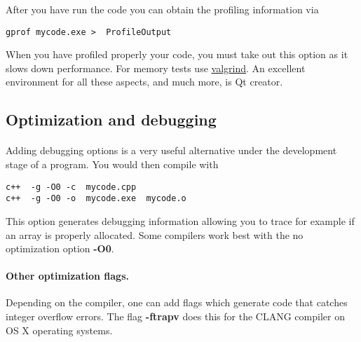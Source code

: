 \documentclass[%
oneside,                 %
final,                   %
10pt]{article}
\begin{document}
After you have run the code you can obtain the profiling information via


\begin{verbatim}
gprof mycode.exe >  ProfileOutput

\end{verbatim}

When you have profiled properly your code, you must take out this option as it 
slows down performance.
For memory tests use \href{{http://www.valgrind.org}}{valgrind}. An excellent environment for all these aspects, and much  more, is  Qt creator.



\subsection*{Optimization and debugging}

\paragraph{}
Adding debugging options is a very useful alternative under the development stage of a program.
You would then compile with 



\begin{verbatim}
c++  -g -O0 -c  mycode.cpp
c++  -g -O0 -o  mycode.exe  mycode.o

\end{verbatim}

This option generates debugging information allowing you to trace for example if an array is properly allocated. Some compilers work best with the no optimization option \textbf{-O0}.



\paragraph{Other optimization flags.}
Depending on the compiler, one can add flags which generate code that catches integer overflow errors. 
The flag \textbf{-ftrapv} does this for the CLANG compiler on OS X operating systems.
\end{document}
